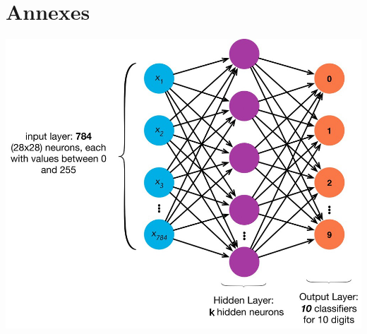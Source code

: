 \documentclass[11pt]{article}
\begin{document}
\section{Annexes } 
 \begin{center}
    \includegraphics[width=\textwidth]{annexes.png}
\end{center}
\end{document}
